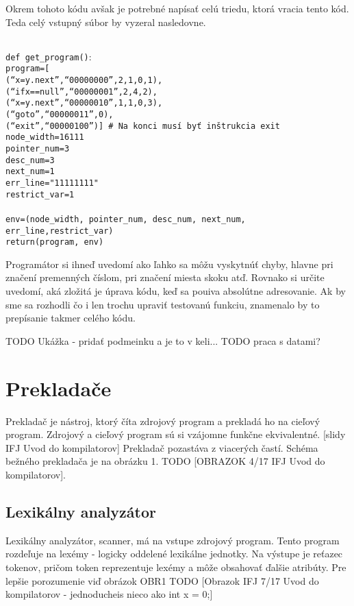 Okrem tohoto kódu avšak je potrebné napísať celú triedu, ktorá vracia tento kód.
Teda celý vstupný súbor by vyzeral nasledovne.


\texttt{
\\
def get\_program()$\colon$\\
\tab program=[\\
\tab \tab (``x=y.next'',``00000000'',2,1,0,1),\\
\tab \tab (``ifx==null'',``00000001'',2,4,2),\\
\tab \tab (``x=y.next'',``00000010'',1,1,0,3),\\
\tab \tab (``goto'',``00000011'',0),\\
\tab \tab (``exit'',``00000100'')]   \# Na konci musí byť inštrukcia exit\\
\tab node\_width=16111 \\
\tab pointer\_num=3\\
\tab desc\_num=3\\
\tab next\_num=1\\
\tab err\_line="11111111"\\
\tab restrict\_var=1\\
\\
\tab env=(node\_width, pointer\_num, desc\_num, next\_num, err\_line,restrict\_var)\\
\tab return(program, env)\\
}

Programátor si ihneď uvedomí ako ľahko sa môžu vyskytnúť chyby, hlavne pri značení
premenných číslom, pri značení miesta skoku atď. Rovnako si určite uvedomí, aká zložitá
je úprava kódu, keď sa pouiva absolútne adresovanie.
Ak by sme sa rozhodli čo i len trochu upraviť testovanú funkciu, znamenalo by to
prepísanie takmer celého kódu.

TODO Ukážka - pridať podmeinku a je to v keli...
TODO praca s datami?




\chapter{Prekladače}
Prekladač je nástroj, ktorý číta zdrojový program a prekladá ho na cieľový program.
Zdrojový a cieľový program sú si vzájomne funkčne ekvivalentné. [slidy IFJ Uvod do kompilatorov]
Prekladač pozastáva z viacerých častí. Schéma bežného prekladača je na obrázku 1.
TODO [OBRAZOK 4/17 IFJ Uvod do kompilatorov].

\section{Lexikálny analyzátor}
Lexikálny analyzátor, scanner, má na vstupe zdrojový program. Tento program
rozdeľuje na lexémy - logicky oddelené lexikálne jednotky. Na výstupe je reťazec
tokenov, pričom token reprezentuje lexémy a môže obsahovať ďalšie atribúty.
Pre lepšie porozumenie viď obrázok OBR1
TODO [Obrazok IFJ 7/17 Uvod do kompilatorov - jednoducheis nieco ako int x = 0;]

